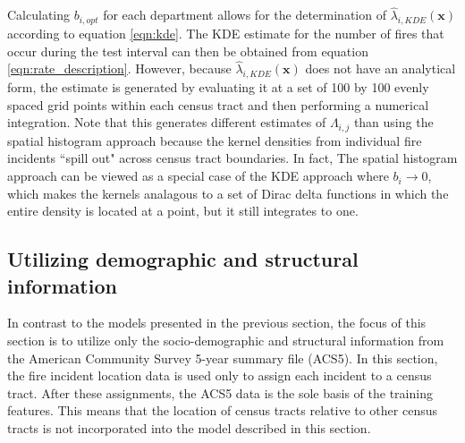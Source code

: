 \documentclass{svjour3}
\begin{document}
  Calculating $b_{i,opt}$ for each department allows for the determination of $\hat\lambda_{i,KDE}(\textbf{x})$ according to equation \ref{eqn:kde}. The KDE estimate for the number of fires that occur during the test interval can then be obtained from equation \ref{eqn:rate_description}. However, because $\hat\lambda_{i,KDE}(\textbf{x})$ does not have an analytical form, the estimate is generated by evaluating it at a set of 100 by 100 evenly spaced grid points within each census tract and then performing a numerical integration. Note that this generates different estimates of  $\Lambda_{i,j}$ than using the spatial histogram approach because the kernel densities from individual fire incidents ``spill out" across census tract boundaries. In fact, The spatial histogram approach can be viewed as a special case of the KDE approach where $b_i \rightarrow 0$, which makes the kernels analagous to a set of Dirac delta functions in which the entire density is located at a point, but it still integrates to one.
  
 

  \subsection{Utilizing demographic and structural information}
  In contrast to the models presented in the previous section, the focus of this section is to utilize only the socio-demographic and structural information from the American Community Survey 5-year summary file (ACS5). In this section, the fire incident location data is used only to assign each incident to a census tract. After these assignments, the ACS5 data is the sole basis of the training features. This means that the location of census tracts relative to other census tracts is not incorporated into the model described in this section.
\end{document}
